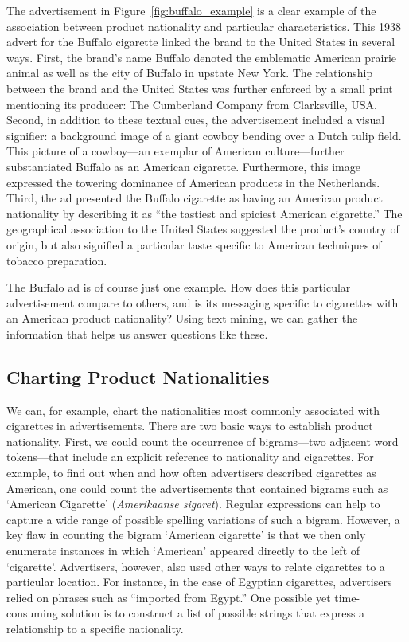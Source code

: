 \documentclass[USenglish]{article}
\begin{document}
The advertisement in Figure~\ref{fig:buffalo_example} is a clear example of the association between product nationality and particular characteristics. This  1938 advert for the Buffalo cigarette linked the brand to the United States in several ways. First, the brand's name Buffalo denoted the emblematic American prairie animal as well as the city of Buffalo in upstate New York. The relationship between the brand and the United States was further enforced by a small print mentioning its producer: The Cumberland Company from Clarksville, USA.
%
Second, in addition to these textual cues, the advertisement included a visual signifier: a background image of a giant cowboy bending over a Dutch tulip field. This picture of a cowboy---an exemplar of American culture---further substantiated Buffalo as an American cigarette. Furthermore, this image expressed the towering dominance of American products in the Netherlands.
%
Third, the ad presented the Buffalo cigarette as having an American product nationality by describing it as ``the tastiest and spiciest American cigarette.'' The geographical association to the United States suggested the product’s country of origin, but also signified a particular taste specific to American techniques of tobacco preparation.

The Buffalo ad is of course just one example. How does this particular advertisement compare to others, and is its messaging specific to cigarettes with an American product nationality? Using text mining, we can gather the information that helps us answer questions like these. 

\subsection{Charting Product Nationalities}
We can, for example, chart the nationalities most commonly associated with cigarettes in advertisements. There are two basic ways to establish product nationality. First, we could count the occurrence of bigrams---two adjacent word tokens---that include an explicit reference to nationality and cigarettes. For example, to find out when and how often advertisers described cigarettes as American, one could count the advertisements that contained bigrams such as `American Cigarette' (\textit{Amerikaanse sigaret}). Regular expressions can help to capture a wide range of possible spelling variations of such a bigram. However, a key flaw in counting the bigram `American cigarette' is that we then only enumerate instances in which `American' appeared directly to the left of `cigarette'. Advertisers, however, also used other ways to relate cigarettes to a particular location. For instance, in the case of Egyptian cigarettes, advertisers relied on phrases such as ``imported from Egypt.'' One possible yet time-consuming solution is to construct a list of possible strings that express a relationship to a specific nationality. 
\end{document}

